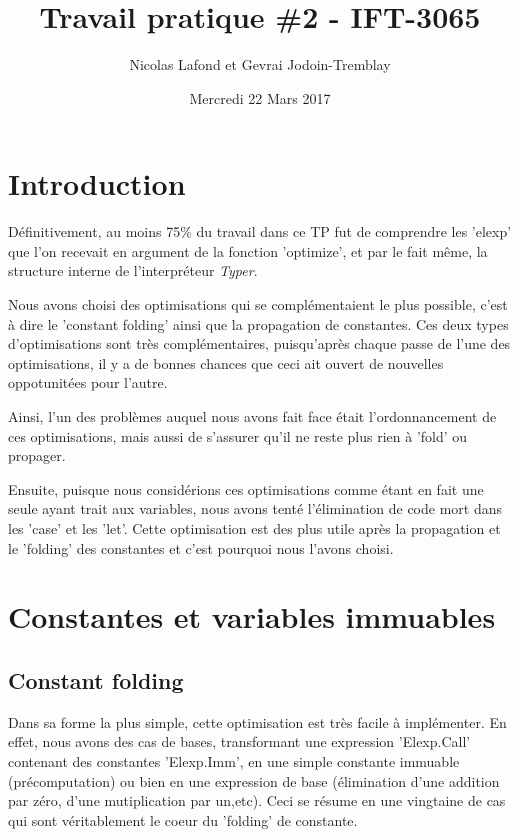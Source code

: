 \documentclass{article}
\begin{document}
\title{Travail pratique \#2 - IFT-3065}
\author{Nicolas Lafond et Gevrai Jodoin-Tremblay}
\date{Mercredi 22 Mars 2017}
\maketitle

\section{Introduction}

Définitivement, au moins 75\% du travail dans ce TP fut de comprendre les 'elexp' que l'on recevait en argument de la fonction 'optimize', et par le fait même, la structure interne de l'interpréteur \emph{Typer}.

Nous avons choisi des optimisations qui se complémentaient le plus possible, c'est à dire le 'constant folding' ainsi que la propagation de constantes. Ces deux types d'optimisations sont très complémentaires, puisqu'après chaque passe de l'une des optimisations, il y a de bonnes chances que ceci ait ouvert de nouvelles oppotunitées pour l'autre.

Ainsi, l'un des problèmes auquel nous avons fait face était l'ordonnancement de ces optimisations, mais aussi de s'assurer qu'il ne reste plus rien à 'fold' ou propager.

Ensuite, puisque nous considérions ces optimisations comme étant en fait une seule ayant trait aux variables, nous avons tenté l'élimination de code mort dans les 'case' et les 'let'. Cette optimisation est des plus utile après la propagation et le 'folding' des constantes et c'est pourquoi nous l'avons choisi.

\section{Constantes et variables immuables}
\subsection{Constant folding}

Dans sa forme la plus simple, cette optimisation est très facile à implémenter. En effet, nous avons des cas de bases, transformant une expression 'Elexp.Call' contenant des constantes 'Elexp.Imm', en une simple constante immuable (précomputation) ou bien en une expression de base (élimination d'une addition par zéro, d'une mutiplication par un,etc). Ceci se résume en une vingtaine de cas qui sont véritablement le coeur du 'folding' de constante.
\end{document}

